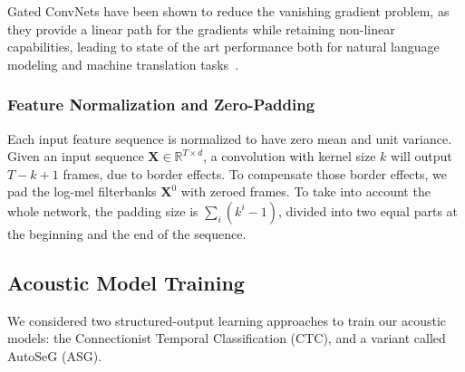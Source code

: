 \documentclass{article}
\def\R{\mathbb{R}}
\begin{document}
Gated ConvNets have been shown to reduce the vanishing gradient problem, as
they provide a linear path for the gradients while retaining non-linear
capabilities, leading to state of the art performance both for natural
language modeling and machine translation
tasks~\citep{dauphin2017lm,gehring2017mt}.

\subsubsection{Feature Normalization and Zero-Padding}

Each input feature sequence is normalized to have zero mean and unit variance.
Given an input sequence $\mathbf{X} \in \R^{T\times d}$, a convolution
with kernel size $k$ will output $T-k+1$ frames, due to border effects. To
compensate those border effects, we pad the log-mel filterbanks $\mathbf{X}^0$
with zeroed frames. To take into account the whole network, the padding size
is $\sum_i (k^i-1)$, divided into two equal parts at the beginning and the
end of the sequence.


\subsection{Acoustic Model Training}

\begin{figure*}[h]
  \centering
{}
  \hspace*{0.1cm}
  \hspace*{0.1cm}
  \caption{
    \label{fig-asg}
    (a) The CTC graph which represents all the acceptable sequences of
    letters for the transcription ``cat'' over 6 frames. (b) The same graph
    used by ASG, where blank labels have been discarded. (c) The fully
    connected graph describing all possible sequences of letter; this graph
    is used for normalization purposes in ASG. Un-normalized transitions
    scores are possible on edges of these graphs. At each time step, nodes
    are assigned a conditional un-normalized score, output by the Gated
    ConvNet acoustic model.}
\end{figure*}
We considered two structured-output learning approaches to train our
acoustic models: the Connectionist Temporal Classification (CTC), and a variant
called AutoSeG (ASG).
\end{document}
